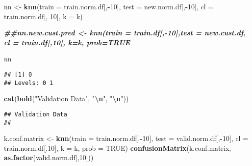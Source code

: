 \documentclass[
]{article}
\newenvironment{Shaded}{\begin{snugshade}}{\end{snugshade}}
\newcommand{\AttributeTok}[1]{\textcolor[rgb]{0.13,0.29,0.53}{#1}}
\newcommand{\ConstantTok}[1]{\textcolor[rgb]{0.56,0.35,0.01}{#1}}
\newcommand{\DecValTok}[1]{\textcolor[rgb]{0.00,0.00,0.81}{#1}}
\newcommand{\DocumentationTok}[1]{\textcolor[rgb]{0.56,0.35,0.01}{\textbf{\textit{#1}}}}
\newcommand{\FunctionTok}[1]{\textcolor[rgb]{0.13,0.29,0.53}{\textbf{#1}}}
\newcommand{\NormalTok}[1]{#1}
\newcommand{\OtherTok}[1]{\textcolor[rgb]{0.56,0.35,0.01}{#1}}
\newcommand{\SpecialCharTok}[1]{\textcolor[rgb]{0.81,0.36,0.00}{\textbf{#1}}}
\newcommand{\StringTok}[1]{\textcolor[rgb]{0.31,0.60,0.02}{#1}}
\begin{document}
\begin{Shaded}
\begin{Highlighting}[]
\NormalTok{nn }\OtherTok{\textless{}{-}} \FunctionTok{knn}\NormalTok{(}\AttributeTok{train =}\NormalTok{ train.norm.df[,}\SpecialCharTok{{-}}\DecValTok{10}\NormalTok{], }\AttributeTok{test =}\NormalTok{ new.norm.df[,}\SpecialCharTok{{-}}\DecValTok{10}\NormalTok{],}
\AttributeTok{cl =}\NormalTok{ train.norm.df[, }\DecValTok{10}\NormalTok{], }\AttributeTok{k =}\NormalTok{ k)}

\DocumentationTok{\#\#nn.new.cust.pred \textless{}{-} knn(train = train.df[,{-}10],test = new.cust.df, cl = train.df[,10], k=k, prob=TRUE}

\NormalTok{nn}
\end{Highlighting}
\end{Shaded}

\begin{verbatim}
## [1] 0
## Levels: 0 1
\end{verbatim}

\begin{Shaded}
\begin{Highlighting}[]
\FunctionTok{cat}\NormalTok{(}\FunctionTok{bold}\NormalTok{(}\StringTok{"Validation Data"}\NormalTok{, }\StringTok{"}\SpecialCharTok{\textbackslash{}n}\StringTok{"}\NormalTok{, }\StringTok{"}\SpecialCharTok{\textbackslash{}n}\StringTok{"}\NormalTok{))}
\end{Highlighting}
\end{Shaded}

\begin{verbatim}
## Validation Data 
## 
\end{verbatim}

\begin{Shaded}
\begin{Highlighting}[]
\NormalTok{k.conf.matrix }\OtherTok{\textless{}{-}} \FunctionTok{knn}\NormalTok{(}\AttributeTok{train =}\NormalTok{ train.norm.df[,}\SpecialCharTok{{-}}\DecValTok{10}\NormalTok{], }\AttributeTok{test =}\NormalTok{ valid.norm.df[,}\SpecialCharTok{{-}}\DecValTok{10}\NormalTok{], }\AttributeTok{cl =}\NormalTok{ train.norm.df[,}\DecValTok{10}\NormalTok{], }\AttributeTok{k =}\NormalTok{ k, }\AttributeTok{prob =} \ConstantTok{TRUE}\NormalTok{)}
\FunctionTok{confusionMatrix}\NormalTok{(k.conf.matrix, }\FunctionTok{as.factor}\NormalTok{(valid.norm.df[,}\DecValTok{10}\NormalTok{]))}
\end{Highlighting}
\end{Shaded}
\end{document}
